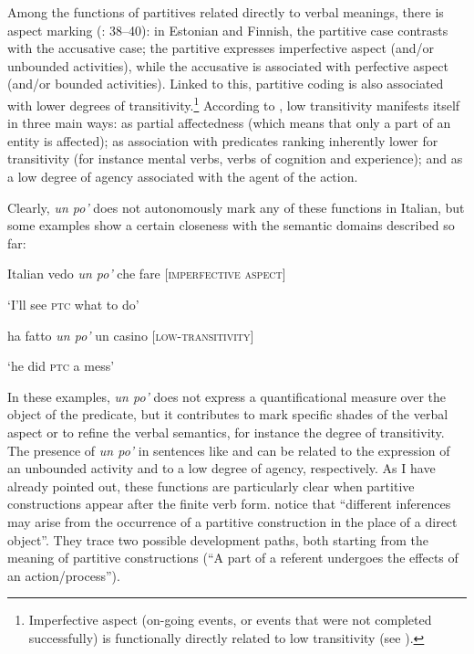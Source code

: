Among the functions of partitives related directly to verbal meanings, there is aspect marking (\citealt{LuraghiKittilä2014}: 38–40): in Estonian and Finnish, the partitive case contrasts with the accusative case; the partitive expresses imperfective aspect (and/or unbounded activities), while the accusative is associated with perfective aspect (and/or bounded activities). Linked to this, partitive coding is also associated with lower degrees of transitivity.\footnote{Imperfective aspect (on-going events, or events that were not completed successfully) is functionally directly related to low transitivity (see \citealt{HopperThompson1980}).} According to \citet[40–46]{LuraghiKittilä2014}, low transitivity manifests itself in three main ways: as partial affectedness  (which means that only a part of an entity is affected); as association with predicates ranking inherently lower for transitivity (for instance mental verbs, verbs of cognition and experience); and as a low degree of agency associated with the agent of the action.

Clearly, \textit{un po’} does not autonomously mark any of these functions in Italian, but some examples show a certain closeness with the semantic domains described so far:

\ea%
    \label{ex:key:63}

           Italian
\ea\label{ex:key:63a}  vedo \textit{un po’} che fare   [\textsc{imperfective} \textsc{aspect]}

\glt ‘I’ll see \textsc{ptc} what to do’

\ex\label{ex:key:63b}  ha fatto \textit{un po’} un casino  [\textsc{low-transitivity}]

\glt ‘he did \textsc{ptc} a mess’
    \z
\z

In these examples, \textit{un po’} does not express a quantificational measure over the object of the predicate, but it contributes to mark specific shades of the verbal aspect or to refine the verbal semantics, for instance the degree of transitivity. The presence of \textit{un po’} in sentences like  and  can be related to the expression of an unbounded activity and to a low degree of agency, respectively. As I have already pointed out, these functions are particularly clear when partitive constructions appear after the finite verb form. \citet[56]{LuraghiKittilä2014} notice that “different inferences may arise from the occurrence of a partitive construction in the place of a direct object”. They trace two possible development paths, both starting from the meaning of partitive constructions (“A part of a referent undergoes the effects of an action/process”).

